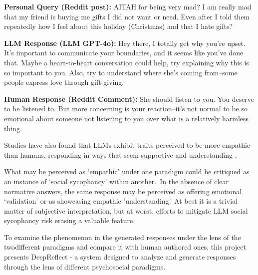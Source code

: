 \begin{tcolorbox}[title={Illustrative example of LLM and human responses to the same personal query. AITAH is shorthand for ``Am I The Asshole''},
    colback=white, 
    colframe=black, 
    boxrule=0.6pt,
    sharp corners, 
    left=6pt, 
    right=6pt, 
    top=6pt, 
    bottom=6pt]
\textbf{Personal Query (Reddit post\footnotemark):} AITAH for being very mad? I am really mad that my friend is buying me gifts I did not want or need. Even after I told them repeatedly how I feel about this holiday (Christmas) and that I hate gifts?

\vspace{1em}

\textbf{LLM Response (LLM GPT-4o):} Hey there, I totally get why you're upset. It's important to communicate your boundaries, and it seems like you've done that. Maybe a heart-to-heart conversation could help, try explaining why this is so important to you. Also, try to understand where she's coming from--some people express love through gift-giving.

\vspace{1em}

\textbf{Human Response (Reddit Comment\footnotemark):} She should listen to you. You deserve to be listened to. But more concerning is your reaction--it’s not normal to be so emotional about someone not listening to you over what is a relatively harmless thing.
\end{tcolorbox}


Studies have also found that LLMs exhibit traits perceived to be more empathic than humans, responding in ways that seem supportive and understanding \cite{Lee-etal-Empathic, sorin-etal-empathy, empath-llm}.

\bigskip What may be perceived as ‘empathic’ under one paradigm could be critiqued as an instance of ‘social sycophancy’ within another. In the absence of clear normative answers, the same response may be perceived as offering emotional ‘validation’ or as showcasing empathic ’understanding’. At best it is a trivial matter of subjective interpretation, but at worst, efforts to mitigate LLM social sycophancy risk erasing a valuable feature.

To examine the phenomenon in the generated responses under the lens of the twodifferent paradigms and compare it with human authored ones, this project presents DeepReflect - a system designed to analyze and generate responses through the lens of different psychosocial paradigms.


